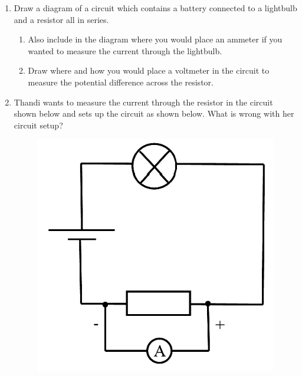 \begin{enumerate}[noitemsep, label=\textbf{\arabic*}. ]
{\begin{center}
\begin{xtabular*}{\mytablewidth}[t]{|p{10\mystarwidth}|p{10\mystarwidth}|p{10\mystarwidth}|p{10\mystarwidth}|}
         &
    
    
     \tabularnewline{}
    \end{xtabular*}
      \end{center}
    \begin{center}{\small\bfseries Table 16.3}\end{center}
    
    \addtocounter{footnote}{-0}
    
        }%
      
    \par
            \item Draw a diagram of a circuit which contains a battery connected to a lightbulb and a resistor all in series. \label{m38776*id6742}\begin{enumerate}[noitemsep, label=\textbf{\alph*}. ] 
            \item  Also include in the diagram where you would place an ammeter if you wanted to measure the current through the lightbulb.\item Draw where and how you would place a voltmeter in the circuit to measure the potential difference across the resistor.\end{enumerate}
                  \item Thandi wants to measure the current through the resistor in the circuit shown below and sets up the circuit as shown below. What is wrong with her circuit setup? 

    \setcounter{subfigure}{0}


	\begin{figure}[H] %
    \begin{center}
    \label{m38776*id6854!!!underscore!!!media}\label{m38776*id6854!!!underscore!!!printimage}\includegraphics[width=0.4\columnwidth]{col11305.imgs/m38776_circuit1.png} %
        

\end{center}
\end{figure}
\end{enumerate}
